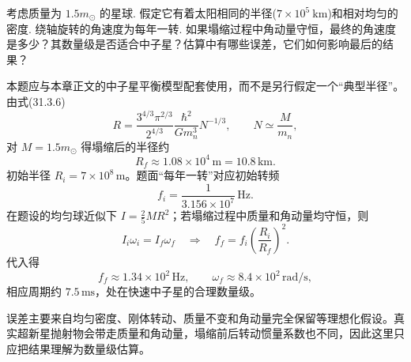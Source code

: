 \begin{exercise}\label{ex:31.2}
考虑质量为 $1.5 m_\odot$ 的星球. 假定它有着太阳相同的半径($7 \times 10^5 \ \mathrm{km}$)和相对均匀的密度. 绕轴旋转的角速度为每年一转. 如果塌缩过程中角动量守恒，最终的角速度是多少？其数量级是否适合中子星？估算中有哪些误差，它们如何影响最后的结果？
\end{exercise}
\begin{solution}
本题应与本章正文的中子星平衡模型配套使用，而不是另行假定一个“典型半径”。由式(31.3.6)
\[
R=\frac{3^{4/3}\pi^{2/3}}{2^{4/3}}
\frac{\hbar^2}{Gm_n^3}N^{-1/3},\qquad N\simeq\frac{M}{m_n},
\]
对 $M=1.5m_\odot$ 得塌缩后的半径约
\[
R_f\approx1.08\times10^4\,\mathrm m=10.8\,\mathrm{km}.
\]
初始半径 $R_i=7\times10^8\,\mathrm m$。题面“每年一转”对应初始转频
\[
f_i=\frac{1}{3.156\times10^7}\,\mathrm{Hz}.
\]
在题设的均匀球近似下 $I=\frac25MR^2$；若塌缩过程中质量和角动量均守恒，则
\[
I_i\omega_i=I_f\omega_f
\quad\Longrightarrow\quad
f_f=f_i\left(\frac{R_i}{R_f}\right)^2.
\]
代入得
\[
\boxed{f_f\approx1.34\times10^2\,\mathrm{Hz}},\qquad
\boxed{\omega_f\approx8.4\times10^2\,\mathrm{rad/s}},
\]
相应周期约 $7.5\,\mathrm{ms}$，处在快速中子星的合理数量级。

误差主要来自均匀密度、刚体转动、质量不变和角动量完全保留等理想化假设。真实超新星抛射物会带走质量和角动量，塌缩前后转动惯量系数也不同，因此这里只应把结果理解为数量级估算。
\end{solution}


